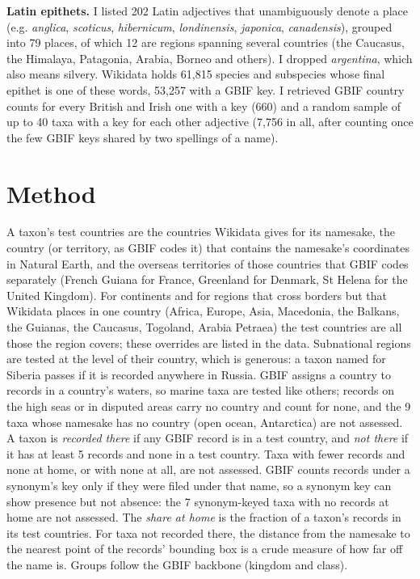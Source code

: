 \documentclass[11pt,a4paper]{article}
\begin{document}
\textbf{Latin epithets.} I listed 202 Latin adjectives that unambiguously denote a place (e.g. \textit{anglica}, \textit{scoticus}, \textit{hibernicum}, \textit{londinensis}, \textit{japonica}, \textit{canadensis}), grouped into 79 places, of which 12 are regions spanning several countries (the Caucasus, the Himalaya, Patagonia, Arabia, Borneo and others). I dropped \textit{argentina}, which also means silvery. Wikidata holds 61,815 species and subspecies whose final epithet is one of these words, 53,257 with a GBIF key. I retrieved GBIF country counts for every British and Irish one with a key (660) and a random sample of up to 40 taxa with a key for each other adjective (7,756 in all, after counting once the few GBIF keys shared by two spellings of a name).

\section{Method}
A taxon's test countries are the countries Wikidata gives for its namesake, the country (or territory, as GBIF codes it) that contains the namesake's coordinates in Natural Earth, and the overseas territories of those countries that GBIF codes separately (French Guiana for France, Greenland for Denmark, St Helena for the United Kingdom). For continents and for regions that cross borders but that Wikidata places in one country (Africa, Europe, Asia, Macedonia, the Balkans, the Guianas, the Caucasus, Togoland, Arabia Petraea) the test countries are all those the region covers; these overrides are listed in the data. Subnational regions are tested at the level of their country, which is generous: a taxon named for Siberia passes if it is recorded anywhere in Russia. GBIF assigns a country to records in a country's waters, so marine taxa are tested like others; records on the high seas or in disputed areas carry no country and count for none, and the 9 taxa whose namesake has no country (open ocean, Antarctica) are not assessed. A taxon is \emph{recorded there} if any GBIF record is in a test country, and \emph{not there} if it has at least 5 records and none in a test country. Taxa with fewer records and none at home, or with none at all, are not assessed. GBIF counts records under a synonym's key only if they were filed under that name, so a synonym key can show presence but not absence: the 7 synonym-keyed taxa with no records at home are not assessed. The \emph{share at home} is the fraction of a taxon's records in its test countries. For taxa not recorded there, the distance from the namesake to the nearest point of the records' bounding box is a crude measure of how far off the name is. Groups follow the GBIF backbone (kingdom and class).
\end{document}
